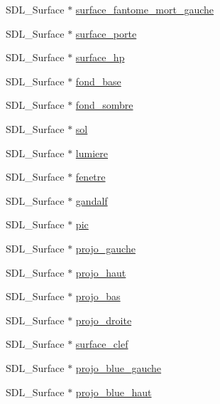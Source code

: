 \begin{DoxyCompactItemize}
\item 
S\-D\-L\-\_\-\-Surface $\ast$ \hyperlink{structsdl_jeu_ad05a5d488af4b9304bd3a918bf03c699}{surface\-\_\-fantome\-\_\-mort\-\_\-gauche}
\item 
S\-D\-L\-\_\-\-Surface $\ast$ \hyperlink{structsdl_jeu_a0421d88f322a7e945216dacac7b0821e}{surface\-\_\-porte}
\item 
S\-D\-L\-\_\-\-Surface $\ast$ \hyperlink{structsdl_jeu_a9f68bf316a2241185e3c8f8b3d038d85}{surface\-\_\-hp}
\item 
S\-D\-L\-\_\-\-Surface $\ast$ \hyperlink{structsdl_jeu_aa4f79a6d22df2ec6768024e745708e2b}{fond\-\_\-base}
\item 
S\-D\-L\-\_\-\-Surface $\ast$ \hyperlink{structsdl_jeu_a85ab02081c98d07a898482a21e48b56e}{fond\-\_\-sombre}
\item 
S\-D\-L\-\_\-\-Surface $\ast$ \hyperlink{structsdl_jeu_a9fe0fcc6750250a9b4ed6c34c6ac18d2}{sol}
\item 
S\-D\-L\-\_\-\-Surface $\ast$ \hyperlink{structsdl_jeu_a18302ff4ecbc30500bf2638c3036aa8d}{lumiere}
\item 
S\-D\-L\-\_\-\-Surface $\ast$ \hyperlink{structsdl_jeu_a96eebd19c7cea6af7e50e821d04ed494}{fenetre}
\item 
S\-D\-L\-\_\-\-Surface $\ast$ \hyperlink{structsdl_jeu_a0a838f8347a9ea3ab071107815325988}{gandalf}
\item 
S\-D\-L\-\_\-\-Surface $\ast$ \hyperlink{structsdl_jeu_a761714fd2e059e5f8b4e0a5246f0413f}{pic}
\item 
S\-D\-L\-\_\-\-Surface $\ast$ \hyperlink{structsdl_jeu_af901fa03839c9ce73b3a49a79e5a417e}{projo\-\_\-gauche}
\item 
S\-D\-L\-\_\-\-Surface $\ast$ \hyperlink{structsdl_jeu_a18c766351a8d4a2399cde76a7d894559}{projo\-\_\-haut}
\item 
S\-D\-L\-\_\-\-Surface $\ast$ \hyperlink{structsdl_jeu_a057caebe9a2bda0166b2767d19d84318}{projo\-\_\-bas}
\item 
S\-D\-L\-\_\-\-Surface $\ast$ \hyperlink{structsdl_jeu_a752f2ccb603dfdb70f4d2da72fb5ccc5}{projo\-\_\-droite}
\item 
S\-D\-L\-\_\-\-Surface $\ast$ \hyperlink{structsdl_jeu_a5d1c1a5b6d8f7dd5b4f69871198f36b9}{surface\-\_\-clef}
\item 
S\-D\-L\-\_\-\-Surface $\ast$ \hyperlink{structsdl_jeu_a319f836c1aeb2c6308e8787e7c19977f}{projo\-\_\-blue\-\_\-gauche}
\item 
S\-D\-L\-\_\-\-Surface $\ast$ \hyperlink{structsdl_jeu_a199f1dad5defaafc584de63f511c9016}{projo\-\_\-blue\-\_\-haut}

\end{DoxyCompactItemize}
